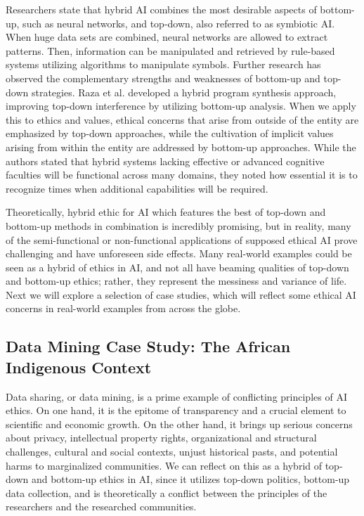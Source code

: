 \documentclass{svproc}
\begin{document}
Researchers state that hybrid AI combines the most desirable aspects of bottom-up, such as neural networks, and top-down, also referred to as symbiotic AI. \cite{SAGAR2021WhatAI} When huge data sets are combined, neural networks are allowed to extract patterns. Then, information can be manipulated and retrieved by rule-based systems utilizing algorithms to manipulate symbols. \cite{SAGAR2021WhatAI} Further research has observed the complementary strengths and weaknesses of bottom-up and top-down strategies. Raza et al. developed a hybrid program synthesis approach, improving top-down interference by utilizing bottom-up analysis. \cite{Raza2020WebInference} When we apply this to ethics and values, ethical concerns that arise from outside of the entity are emphasized by top-down approaches, while the cultivation of implicit values arising from within the entity are addressed by bottom-up approaches. \cite{Wallach2008MachineFaculties} While the authors stated that hybrid systems lacking effective or advanced cognitive faculties will be functional across many domains, they noted how essential it is to recognize times when additional capabilities will be required. \cite{Wallach2008MachineFaculties}


Theoretically, hybrid ethic for AI which features the best of top-down and bottom-up methods in combination is incredibly promising, but in reality, many of the semi-functional or non-functional applications of supposed ethical AI prove challenging and have unforeseen side effects. Many real-world examples could be seen as a hybrid of ethics in AI, and not all have beaming qualities of top-down and bottom-up ethics; rather, they represent the messiness and variance of life. Next we will explore a selection of case studies, which will reflect some ethical AI concerns in real-world examples from across the globe. 

\subsection{Data Mining Case Study: The African Indigenous Context
}

Data sharing, or data mining, is a prime example of conflicting principles of AI ethics. On one hand, it is the epitome of transparency and a crucial element to scientific and economic growth. On the other hand, it brings up serious concerns about privacy, intellectual property rights, organizational and structural challenges, cultural and social contexts, unjust historical pasts, and potential harms to marginalized communities. \cite{Abebe2021NarrativesAfrica} We can reflect on this as a hybrid of top-down and bottom-up ethics in AI, since it utilizes top-down politics, bottom-up data collection, and is theoretically a conflict between the principles of the researchers and the researched communities. 
\end{document}
